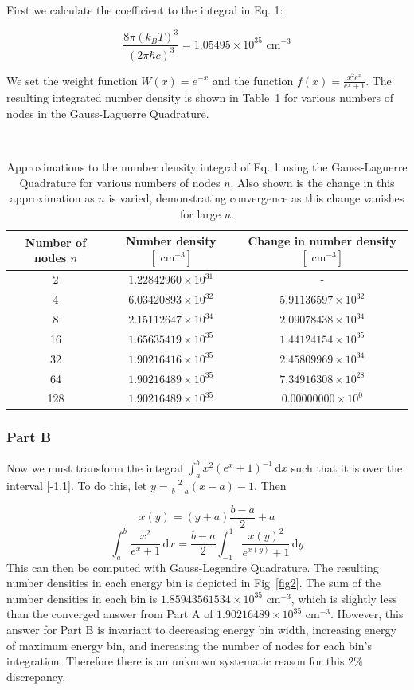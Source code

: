 \documentclass{article}
\newcommand{\inte}[4]{\int_{#1}^{#2} \! #3 \, \mathrm{d} #4}
\newcommand{\ee}[1]{\times 10^{#1}}
\newcommand{\cm}[0]{\text{\ cm}}
\begin{document}
\begin{spacing}{1.1}
First we calculate the coefficient to the integral in Eq. 1:

\[
\frac{8 \pi \left(k_B T\right)^3}{\left(2 \pi \hbar c\right)^3} = 1.05495\ee{35} \cm^{-3}
\]

We set the weight function \(W(x) = e^{-x}\) and the function \(f(x) = \frac{x^2 e^{x}}{e^x + 1}\). The resulting integrated number density is shown in Table~1 for various numbers of nodes in the Gauss-Laguerre Quadrature.

\begin{table}[H]
	\label{table1}
	\centering
    \begin{tabular}{|c|c|c|}
	\hline
	
	Number of nodes \(n\) & Number density \([\cm^{-3}]\) & Change in number density \([\cm^{-3}]\) \\

	\hline

    2 & \(1.22842960\ee{31}\) & - \\
    4 & \(6.03420893\ee{32}\) & \(5.91136597\ee{32}\) \\ 
    8 & \(2.15112647\ee{34}\) & \(2.09078438\ee{34}\) \\
    16 & \(1.65635419\ee{35}\) & \(1.44124154\ee{35}\) \\
    32 & \(1.90216416\ee{35}\) & \(2.45809969\ee{34}\) \\
    64 & \(1.90216489\ee{35}\) & \(7.34916308\ee{28}\) \\
    128 & \(1.90216489\ee{35}\) & \(0.00000000\ee{0}\) \\
    
	\hline
	\end{tabular}
	\caption{Approximations to the number density integral of Eq. 1 using the Gauss-Laguerre Quadrature for various numbers of nodes \(n\). Also shown is the change in this approximation as \(n\) is varied, demonstrating convergence as this change vanishes for large \(n\).}
	\end{table}

\subsubsection{Part B}

Now we must transform the integral \(\inte{a}{b}{x^2 (e^x + 1)^{-1}}{x}\) such that it is over the interval [-1,1]. To do this, let \(y = \frac{2}{b-a} (x-a) - 1\). Then

\[
x(y) = (y + a) \frac{b-a}{2} + a
\]
\[
\inte{a}{b}{\frac{x^2}{e^x + 1}}{x} = \frac{b-a}{2}\inte{-1}{1}{\frac{x(y)^2}{e^{x(y)} + 1}}{y}
\]
This can then be computed with Gauss-Legendre Quadrature. The resulting number densities in each energy bin is depicted in Fig~\ref{fig2}. The sum of the number densities in each bin is \(1.85943561534\ee{35} \cm^{-3}\), which is slightly less than the converged answer from Part A of \(1.90216489\ee{35} \cm^{-3}\). However, this answer for Part B is invariant to decreasing energy bin width, increasing energy of maximum energy bin, and increasing the number of nodes for each bin's integration. Therefore there is an unknown systematic reason for this 2\% discrepancy.


\end{spacing}
\end{document}
